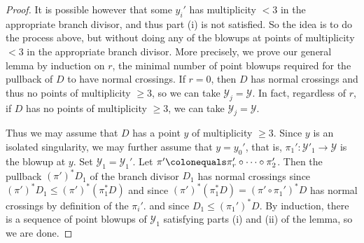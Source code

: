 \documentclass[12pt]{amsart}
\numberwithin{equation}{section}
\theoremstyle{definition}
\newcommand{\padma}[1]{{\color{Magenta} \sf $\clubsuit\clubsuit\clubsuit$ Padma: [#1]}}
\newcommand{\mc}[1]{\mathcal{#1}}
\newcommand{\X}{\mathcal{X}}
\newcommand{\Y}{\mathcal{Y}}
\begin{document}
\begin{proof}
    
    It is possible however that some $y_i'$
    has multiplicity $< 3$ in the appropriate branch divisor, and thus part (i) is not
    satisfied. So the idea is to do the process above, but without doing any of
    the blowups at points of multiplicity $< 3$ in the appropriate
    branch divisor.  More precisely, we prove our general lemma by induction on $r$, the minimal number of point blowups required for the pullback of $D$ to have normal crossings.  If $r = 0$, then $D$ has normal crossings and thus no points
    of multiplicity $\geq 3$, so we can take $\mc{Y}_j = \mc{Y}$.  In
    fact, regardless of $r$, if $D$ has no points of multiplicity
    $\geq 3$, we can take $\Y_j = \Y$.

    Thus we may assume that $D$ has a point $y$ of multiplicity $\geq
    3$.  Since $y$ is an isolated singularity, we may further assume that $y =
    y_0'$, that is, $\pi_1' \colon \Y'_1 \to \Y$ is the blowup at $y$. Set $\Y_1 =
    \Y_1'$. Let $\pi' \colonequals \pi_r' \circ \cdots \circ \pi_2'$. Then the pullback $(\pi')^*D_1$ of the branch divisor $D_1$ has normal crossings since $(\pi')^*D_1 \leq (\pi')^*(\pi_1^*D)$ and since  $(\pi')^*(\pi_1^*D) = (\pi' \circ \pi_1')^*D$ has normal crossings by definition of the $\pi_i'$. and since
    $D_1 \leq (\pi_1')^* D$.  By induction, there is a sequence
    of point blowups of $\Y_1$ satisfying parts (i) and (ii) of the
    lemma, so we are done.
    \end{proof}
\end{document}
